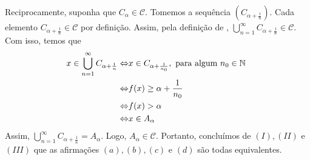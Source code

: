 \begin{prova}
		Reciprocamente, suponha que $C_\alpha \in \mathcal{C}$. Tomemos a sequência $\left(C_{\alpha + \frac{1}{n}}\right)$.
		Cada elemento $C_{\alpha +\frac{1}{n}} \in \mathcal{C}$ por definição.
		Assim, pela definição de \sigal, 
		$\displaystyle \bigcup_{n = 1}^\infty C_{\alpha +\frac{1}{n}} \in \mathcal{C}$. Com isso, temos que
		\begin{align*}
		    x \in \displaystyle \bigcup_{n = 1}^\infty C_{\alpha +\frac{1}{n}}
		    \Leftrightarrow & x \in C_{\alpha + \frac{1}{n_0}}, \textrm{\ para algum  $n_0 \in \operatorname{\mathbb{N}}$ }\\
		    \Leftrightarrow & f(x)\geq \alpha +\dfrac{1}{n_0}\\
		    \Leftrightarrow & f(x) > \alpha \\
		    \Leftrightarrow & x \in A_\alpha
		\end{align*}
		Assim, $\displaystyle \bigcup_{n = 1}^\infty C_{\alpha +\frac{1}{n}} = A_\alpha$. Logo, $A_\alpha \in \mathcal{C}$.
		Portanto, concluímos de $(I), (II)$ e $(III)$ que as afirmações $(a), (b), (c)$ e $(d)$ são todas equivalentes.
\end{prova}

